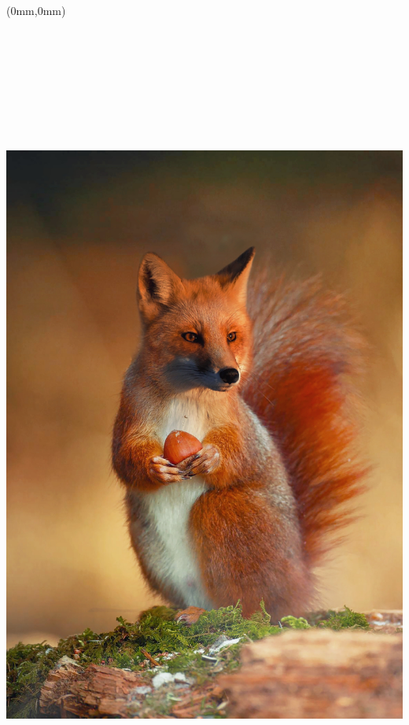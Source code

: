 
\pagestyle{empty}

\textblockorigin{0mm}{0mm}
\setlength{\parindent}{0mm}

\begin{textblock*}{\paperwidth}(0mm,0mm)
\includegraphics[height=11in, width=\paperwidth]{src/GuideEnActuariat/couverture.jpg} \\
\end{textblock*}

